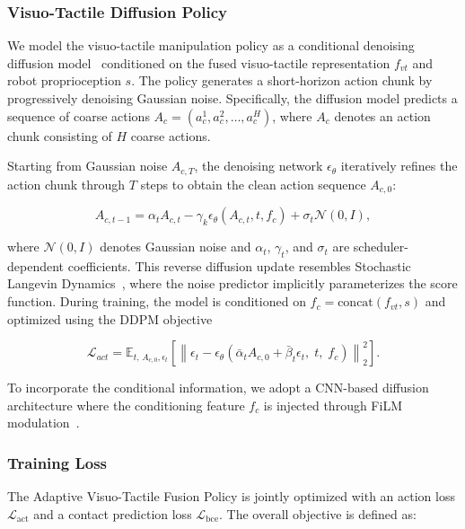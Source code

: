 \subsubsection{Visuo-Tactile Diffusion Policy}
We model the visuo-tactile manipulation policy as a conditional denoising diffusion model~\cite{chi2025diffusion} conditioned on the fused visuo-tactile representation $f_{vt}$ and robot proprioception $s$. The policy generates a short-horizon action chunk by progressively denoising Gaussian noise. Specifically, the diffusion model predicts a sequence of coarse actions $A_c = (a_c^1, a_c^2, \dots, a_c^H)$, where $A_c$ denotes an action chunk consisting of $H$ coarse actions.

Starting from Gaussian noise $A_{c,T}$, the denoising network $\epsilon_\theta$ iteratively refines the action chunk through $T$ steps to obtain the clean action sequence $A_{c,0}$:

\begin{equation}
A_{c,t-1} = \alpha_t A_{c,t} - \gamma_k \epsilon_\theta(A_{c,t}, t, f_c) + \sigma_t \mathcal{N}(0, I),
\end{equation}

where $\mathcal{N}(0, I)$ denotes Gaussian noise and $\alpha_t$, $\gamma_t$, and $\sigma_t$ are scheduler-dependent coefficients. This reverse diffusion update resembles Stochastic Langevin Dynamics~\cite{welling2011bayesian}, where the noise predictor implicitly parameterizes the score function.
During training, the model is conditioned on $f_c = \text{concat}(f_{vt}, s)$ and optimized using the DDPM objective

\begin{equation}
\mathcal{L}_{act} =
\mathbb{E}_{t,\, A_{c,0}, \epsilon_t}
\left[
\left\|
\epsilon_t -
\epsilon_\theta
\left(
\bar{\alpha}_t A_{c,0} + \bar{\beta}_t \epsilon_t,\; t,\; f_c
\right)
\right\|_2^2
\right].
\end{equation}

To incorporate the conditional information, we adopt a CNN-based diffusion architecture where the conditioning feature $f_c$ is injected through FiLM modulation~\cite{perez2018film}.

\subsubsection{Training Loss}
The Adaptive Visuo-Tactile Fusion Policy is jointly optimized with an action loss $\mathcal{L}_{\text{act}}$ and a contact prediction loss $\mathcal{L}_{\text{bce}}$. The overall objective is defined as:

